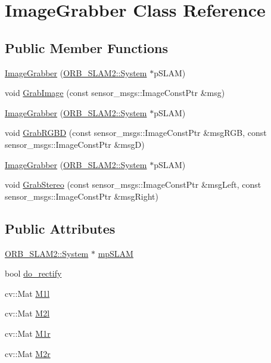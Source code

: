\hypertarget{class_image_grabber}{}\section{Image\+Grabber Class Reference}
\label{class_image_grabber}
\subsection*{Public Member Functions}
\begin{DoxyCompactItemize}
\item 
\mbox{\hyperlink{class_image_grabber_aa7692b812eafa9a76e82b96794999239}{Image\+Grabber}} (\mbox{\hyperlink{class_o_r_b___s_l_a_m2_1_1_system}{O\+R\+B\+\_\+\+S\+L\+A\+M2\+::\+System}} $\ast$p\+S\+L\+AM)
\item 
void \mbox{\hyperlink{class_image_grabber_a66758ed685acbf1a7e77b3325001e47c}{Grab\+Image}} (const sensor\+\_\+msgs\+::\+Image\+Const\+Ptr \&msg)
\item 
\mbox{\hyperlink{class_image_grabber_aa7692b812eafa9a76e82b96794999239}{Image\+Grabber}} (\mbox{\hyperlink{class_o_r_b___s_l_a_m2_1_1_system}{O\+R\+B\+\_\+\+S\+L\+A\+M2\+::\+System}} $\ast$p\+S\+L\+AM)
\item 
void \mbox{\hyperlink{class_image_grabber_ab6df23b898365aa3df99628e4c925aee}{Grab\+R\+G\+BD}} (const sensor\+\_\+msgs\+::\+Image\+Const\+Ptr \&msg\+R\+GB, const sensor\+\_\+msgs\+::\+Image\+Const\+Ptr \&msgD)
\item 
\mbox{\hyperlink{class_image_grabber_aa7692b812eafa9a76e82b96794999239}{Image\+Grabber}} (\mbox{\hyperlink{class_o_r_b___s_l_a_m2_1_1_system}{O\+R\+B\+\_\+\+S\+L\+A\+M2\+::\+System}} $\ast$p\+S\+L\+AM)
\item 
void \mbox{\hyperlink{class_image_grabber_a640450feb6e5df2cb0b2aae7574367c2}{Grab\+Stereo}} (const sensor\+\_\+msgs\+::\+Image\+Const\+Ptr \&msg\+Left, const sensor\+\_\+msgs\+::\+Image\+Const\+Ptr \&msg\+Right)
\end{DoxyCompactItemize}
\subsection*{Public Attributes}
\begin{DoxyCompactItemize}
\item 
\mbox{\hyperlink{class_o_r_b___s_l_a_m2_1_1_system}{O\+R\+B\+\_\+\+S\+L\+A\+M2\+::\+System}} $\ast$ \mbox{\hyperlink{class_image_grabber_a09543ab679feffd1969ad9bca851652f}{mp\+S\+L\+AM}}
\item 
bool \mbox{\hyperlink{class_image_grabber_a773e5d7e773fd5e2cf695e9b7de418b0}{do\+\_\+rectify}}
\item 
cv\+::\+Mat \mbox{\hyperlink{class_image_grabber_a6074a577631bc9ca7cb1e9a53d384175}{M1l}}
\item 
cv\+::\+Mat \mbox{\hyperlink{class_image_grabber_ac85158e1dfb61d91c16271649d9a0354}{M2l}}
\item 
cv\+::\+Mat \mbox{\hyperlink{class_image_grabber_a1b32be412baa2e1a606863375ba8ff83}{M1r}}
\item 
cv\+::\+Mat \mbox{\hyperlink{class_image_grabber_aaf139de883a63055e03d4c82e953bb88}{M2r}}
\end{DoxyCompactItemize}


